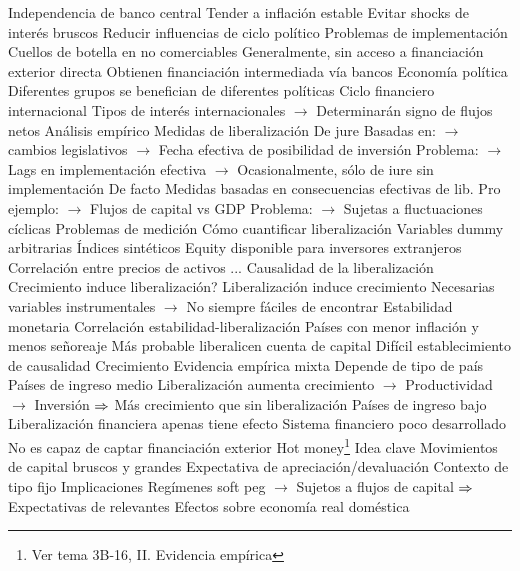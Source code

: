 \documentclass{nuevotema}
\begin{document}
\begin{esquemal}
				\4 Independencia de banco central
				\4[] Tender a inflación estable
				\4[] Evitar shocks de interés bruscos
				\4[] Reducir influencias de ciclo político
			\3 Problemas de implementación
				\4 Cuellos de botella en no comerciables
				\4[] Generalmente, sin acceso a financiación exterior directa
				\4[] Obtienen financiación intermediada vía bancos
				\4 Economía política
				\4[] Diferentes grupos se benefician de diferentes políticas
				\4 Ciclo financiero internacional
				\4[] Tipos de interés internacionales
				\4[] $\to$ Determinarán signo de flujos netos
		\2 Análisis empírico
			\3 Medidas de liberalización
				\4 De jure
				\4[] Basadas en:
				\4[] $\to$ cambios legislativos
				\4[] $\to$ Fecha efectiva de posibilidad de inversión
				\4[] Problema:
				\4[] $\to$ Lags en implementación efectiva
				\4[] $\to$ Ocasionalmente, sólo de iure sin implementación
				\4 De facto
				\4[] Medidas basadas en consecuencias efectivas de lib.
				\4[] Pro ejemplo:
				\4[] $\to$ Flujos de capital vs GDP
				\4[] Problema:
				\4[] $\to$ Sujetas a fluctuaciones cíclicas
			\3 Problemas de medición
				\4 Cómo cuantificar liberalización
				\4[] Variables dummy arbitrarias
				\4[] Índices sintéticos
				\4[] Equity disponible para inversores extranjeros
				\4[] Correlación entre precios de activos
				\4[] ...
				\4 Causalidad de la liberalización
				\4[] Crecimiento induce liberalización?
				\4[] Liberalización induce crecimiento
				\4[] Necesarias variables instrumentales
				\4[] $\to$ No siempre fáciles de encontrar
			\3 Estabilidad monetaria
				\4 Correlación estabilidad-liberalización
				\4 Países con menor inflación y menos señoreaje
				\4[] Más probable liberalicen cuenta de capital
				\4 Difícil establecimiento de causalidad
			\3 Crecimiento
				\4 Evidencia empírica mixta
				\4[] Depende de tipo de país
				\4 Países de ingreso medio
				\4[] Liberalización aumenta crecimiento
				\4[] $\to$ Productividad
				\4[] $\to$ Inversión
				\4[] $\Rightarrow$ Más crecimiento que sin liberalización
				\4 Países de ingreso bajo
				\4[] Liberalización financiera apenas tiene efecto
				\4[] Sistema financiero poco desarrollado
				\4[] No es capaz de captar financiación exterior
			\3 Hot money\footnote{Ver tema 3B-16, II. Evidencia empírica}
				\4 Idea clave
				\4[] Movimientos de capital bruscos y grandes
				\4[] Expectativa de apreciación/devaluación
				\4[] Contexto de tipo fijo
				\4 Implicaciones
				\4[] Regímenes soft peg
				\4[] $\to$ Sujetos a flujos de capital
				\4[] $\Rightarrow$ Expectativas de relevantes
				\4[] Efectos sobre economía real doméstica

\end{esquemal}
\end{document}
